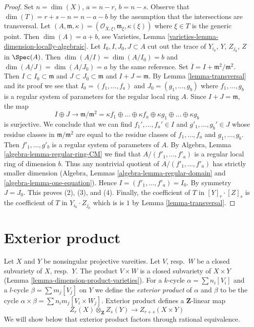 \begin{proof}
Set $n = \dim(X)$, $a = n - r$, $b = n - s$. Observe that
$\dim(T) = r + s - n = n - a - b$ by the assumption that the
intersections are transversal. Let $(A, \mathfrak m, \kappa) =
(\mathcal{O}_{X, \xi}, \mathfrak m_\xi, \kappa(\xi))$ where $\xi \in T$
is the generic point. Then $\dim(A) = a + b$, see
Varieties, Lemma \ref{varieties-lemma-dimension-locally-algebraic}.
Let $I_0, I, J_0, J \subset A$ cut out the trace of
$Y_{i_0}$, $Y$, $Z_{j_0}$, $Z$ in $\Spec(A)$.
Then $\dim(A/I) = \dim(A/I_0) = b$ and $\dim(A/J) = \dim(A/J_0) = a$
by the same reference. Set $\overline{I} = I + \mathfrak m^2/\mathfrak m^2$.
Then $I \subset I_0 \subset \mathfrak m$ and
$J \subset J_0 \subset \mathfrak m$ and $I + J = \mathfrak m$.
By Lemma \ref{lemma-transversal} and its proof we see that
$I_0 = (f_1, \ldots, f_a)$ and $J_0 = (g_1, \ldots, g_b)$
where $f_1, \ldots, g_b$ is a regular system of parameters
for the regular local ring $A$. Since $I + J = \mathfrak m$, the map
$$
I \oplus J \to
\mathfrak m/\mathfrak m^2 =
\kappa f_1
\oplus \ldots \oplus
\kappa f_a
\oplus
\kappa g_1
\oplus \ldots \oplus
\kappa g_b
$$
is surjective. We conclude that we can find
$f_1', \ldots, f_a' \in I$ and $g'_1, \ldots, g_b' \in J$
whose residue classes in $\mathfrak m/\mathfrak m^2$ are equal to the
residue classes of $f_1, \ldots, f_a$ and $g_1, \ldots, g_b$.
Then $f'_1, \ldots, g'_b$ is a regular system of parameters of $A$.
By Algebra, Lemma \ref{algebra-lemma-regular-ring-CM} we find that
$A/(f'_1, \ldots, f'_a)$ is a regular local ring of dimension $b$.
Thus any nontrivial quotient of $A/(f'_1, \ldots, f'_a)$
has strictly smaller dimension
(Algebra, Lemmas \ref{algebra-lemma-regular-domain} and
\ref{algebra-lemma-one-equation}). Hence $I = (f'_1, \ldots, f'_a) = I_0$.
By symmetry $J = J_0$. This proves (2), (3), and (4).
Finally, the coefficient of $T$ in $[Y]_r \cdot [Z]_s$
is the coefficient of $T$ in $Y_{i_0} \cdot Z_{j_0}$ which is
is $1$ by Lemma \ref{lemma-transversal}.
\end{proof}



\section{Exterior product}
\label{section-exterior-product}

\noindent
Let $X$ and $Y$ be nonsingular projective vareities.
Let $V$, resp.\ $W$ be a closed subvariety of $X$, resp.\ $Y$.
The product $V\times W$ is a closed subvariety of $X\times Y$
(Lemma \ref{lemma-dimension-product-varieties}).
For a $k$-cycle $\alpha = \sum n_i [V_i]$ and a $l$-cycle
$\beta = \sum m_j [V_j]$ on $Y$ we define the
{\it exterior product} of $\alpha$ and $\beta$ to be the cycle
$\alpha \times \beta = \sum n_i m_j [V_i \times W_j]$.
Exterior product defines a $\mathbf{Z}$-linear map
$$
Z_r(X) \otimes_\mathbf{Z} Z_s(Y) \longrightarrow Z_{r + s}(X \times Y)
$$
We will show below that exterior product factors through rational
equivalence.

